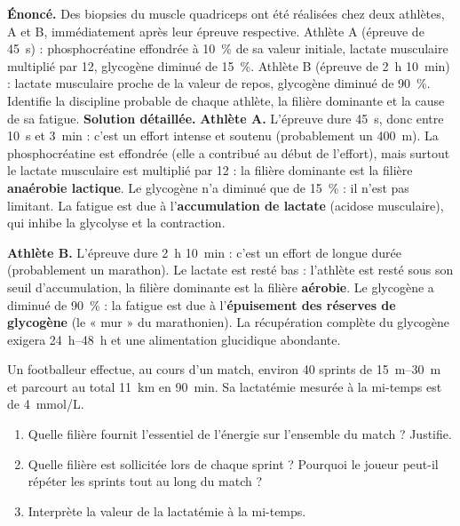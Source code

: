 \documentclass[11pt]{article}
\begin{document}
\begin{exoresolu}
\textbf{Énoncé.} Des biopsies du muscle quadriceps ont été réalisées chez deux athlètes, A et B, immédiatement après leur épreuve respective. Athlète A (épreuve de \SI{45}{s}) : phosphocréatine effondrée à \SI{10}{\%} de sa valeur initiale, lactate musculaire multiplié par 12, glycogène diminué de \SI{15}{\%}. Athlète B (épreuve de \SI{2}{h} \SI{10}{min}) : lactate musculaire proche de la valeur de repos, glycogène diminué de \SI{90}{\%}. Identifie la discipline probable de chaque athlète, la filière dominante et la cause de sa fatigue.
\tcblower
\textbf{Solution détaillée.}
\textbf{Athlète A.} L'épreuve dure \SI{45}{s}, donc entre \SI{10}{s} et \SI{3}{min} : c'est un effort intense et soutenu (probablement un \SI{400}{m}). La phosphocréatine est effondrée (elle a contribué au début de l'effort), mais surtout le lactate musculaire est multiplié par 12 : la filière dominante est la filière \textbf{anaérobie lactique}. Le glycogène n'a diminué que de \SI{15}{\%} : il n'est pas limitant. La fatigue est due à l'\textbf{accumulation de lactate} (acidose musculaire), qui inhibe la glycolyse et la contraction.

\textbf{Athlète B.} L'épreuve dure \SI{2}{h} \SI{10}{min} : c'est un effort de longue durée (probablement un marathon). Le lactate est resté bas : l'athlète est resté sous son seuil d'accumulation, la filière dominante est la filière \textbf{aérobie}. Le glycogène a diminué de \SI{90}{\%} : la fatigue est due à l'\textbf{épuisement des réserves de glycogène} (le « mur » du marathonien). La récupération complète du glycogène exigera \SIrange{24}{48}{h} et une alimentation glucidique abondante.
\end{exoresolu}

\begin{exercice}
Un footballeur effectue, au cours d'un match, environ 40 sprints de \SIrange{15}{30}{m} et parcourt au total \SI{11}{km} en \SI{90}{min}. Sa lactatémie mesurée à la mi-temps est de \SI{4}{mmol/L}.
\begin{enumerate}
\item Quelle filière fournit l'essentiel de l'énergie sur l'ensemble du match ? Justifie.
\item Quelle filière est sollicitée lors de chaque sprint ? Pourquoi le joueur peut-il répéter les sprints tout au long du match ?
\item Interprète la valeur de la lactatémie à la mi-temps.
\end{enumerate}
\end{exercice}
\end{document}

